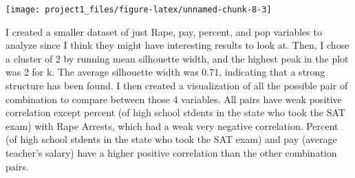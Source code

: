 \documentclass[
]{article}
\begin{document}
\begin{center}\texttt{[image: project1\_files/figure-latex/unnamed-chunk-8-3]} \end{center}

I created a smaller dataset of just Rape, pay, percent, and pop
variables to analyze since I think they might have interesting results
to look at. Then, I chose a cluster of 2 by running mean silhouette
width, and the highest peak in the plot was 2 for k. The average
silhouette width was 0.71, indicating that a strong structure has been
found. I then created a visualization of all the possible pair of
combination to compare between those 4 variables. All pairs have weak
positive correlation except percent (of high school stdents in the state
who took the SAT exam) with Rape Arrests, which had a weak very negative
correlation. Percent (of high school stdents in the state who took the
SAT exam) and pay (average teacher's salary) have a higher positive
correlation than the other combination pairs.
\end{document}
